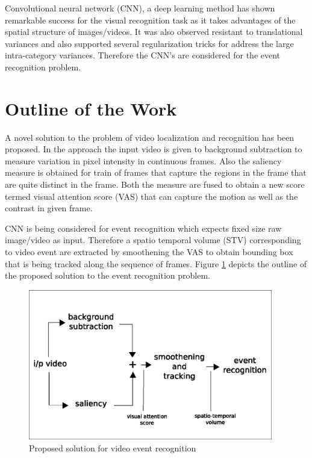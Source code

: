 \par Convolutional neural network (CNN), a deep learning method has shown remarkable success for the visual recognition task as it takes advantages of the spatial structure of images/videos.  It was also observed resistant to translational variances and also supported several regularization tricks for address the large intra-category variances.  Therefore the CNN's are considered for  the event recognition problem.

\clearpage
\section{Outline of the Work}
A novel solution to the problem of video localization and recognition has been proposed. In the approach the input video is given to background subtraction to measure variation in pixel intensity in continuous frames.  Also the saliency measure is obtained for train of frames that capture the regions in the frame that are quite distinct in the frame.  Both the measure are fused to obtain a new score termed visual attention score (VAS) that can capture the motion as well as the contrast in given frame. 
\par CNN is being considered for event recognition which expects fixed size raw image/video as input. Therefore a spatio temporal volume (STV) corresponding to video event are extracted by smoothening the VAS to obtain bounding box that is being tracked along the sequence of frames.  Figure \ref{fig:outline} depicts the outline of the proposed solution to the event recognition problem.
\begin{figure}[htpb]
   \begin{center}
	    \includegraphics[width=0.95\textwidth]{snaps/outline.eps}     
     \caption {Proposed solution for video event recognition}
   \label{fig:outline}
   \end{center}
 \end{figure}
 
